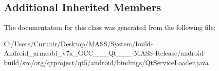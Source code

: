 \subsection*{Additional Inherited Members}


The documentation for this class was generated from the following file\+:\begin{DoxyCompactItemize}
\item 
C\+:/\+Users/\+Curunir/\+Desktop/\+M\+A\+S\+S/\+System/build-\/\+Android\+\_\+armeabi\+\_\+v7a\+\_\+\+G\+C\+C\+\_\+\_\+\_\+\+Qt\+\_\+\_\+\_-\/\+M\+A\+S\+S-\/\+Release/android-\/build/src/org/qtproject/qt5/android/bindings/Qt\+Service\+Loader.\+java\end{DoxyCompactItemize}
